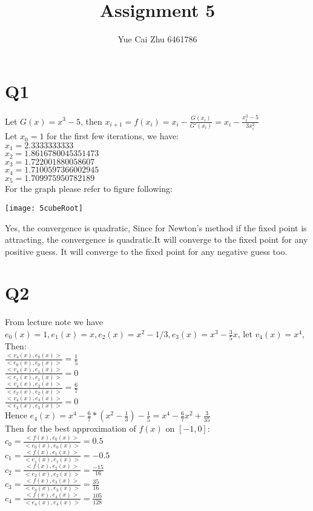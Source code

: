 \documentclass[]{article}
\title{Assignment 5}
\author{Yue Cai Zhu 6461786}
\begin{document}
\maketitle


\section{Q1}
Let $G(x) = x^3 - 5$, then $x_{i+1}=f(x_i)=x_i - \frac{G(x_i)}{G'(x_i)}=x_i - \frac{x_i^3-5}{3x_i^2}$\\
Let $x_0 = 1$ for the first few iterations, we have:\\
$x_1=2.3333333333$\\
$x_2=1.8616780045351473$\\
$x_3=1.722001880058607$\\
$x_4=1.7100597366002945$\\
$x_5=1.709975950782189$\\
For the graph please refer to figure following:
\begin{center}
 
\texttt{[image: 5cubeRoot]}
\end{center}
Yes, the convergence is quadratic, Since for Newton's method if the fixed point is attracting, the convergence is quadratic.It will converge to the fixed point for any positive guess. It will converge to the fixed point for any negative guess too.


\section{Q2}
From lecture note we have $e_0(x)=1,e_1(x)= x,e_2(x)= x^2-1/3,e_3(x)= x^3-\frac{3}{5}x$, let $v_4(x)=x^4$, Then:\\
$\frac{<v_4(x),e_0(x)>}{<e_0(x),e_0(x)>}=\frac{1}{5}$\\
$\frac{<v_4(x),e_1(x)>}{<e_1(x),e_1(x)>}=0$\\
$\frac{<v_4(x),e_2(x)>}{<e_2(x),e_2(x)>}=\frac{6}{7}$\\
$\frac{<v_4(x),e_3(x)>}{<e_3(x),e_3(x)>}=0$\\
Hence $e_4(x)=x^4-\frac{6}{7}*(x^2-\frac{1}{3}) -\frac{1}{5}=x^4-\frac{6}{7}x^2+\frac{3}{35}$\\
Then for the best approximation of $f(x)$ on $[-1,0]$:\\
$c_0=\frac{<f(x),e_0(x)>}{<e_0(x),e_0(x)>}=0.5$\\
$c_1=\frac{<f(x),e_1(x)>}{<e_1(x),e_1(x)>}=-0.5$\\
$c_2=\frac{<f(x),e_2(x)>}{<e_2(x),e_2(x)>}=\frac{-15}{16}$\\
$c_3=\frac{<f(x),e_3(x)>}{<e_3(x),e_3(x)>}=\frac{35}{16}$\\
$c_4=\frac{<f(x),e_4(x)>}{<e_4(x),e_4(x)>}=\frac{105}{128}$\\
\end{document}
